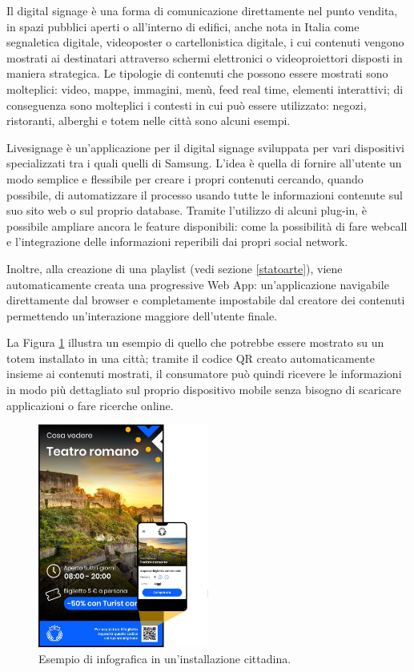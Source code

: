 Il digital signage è una forma di comunicazione direttamente nel punto vendita, in spazi pubblici aperti o all'interno di edifici, anche nota in Italia come segnaletica digitale, videoposter o cartellonistica digitale, i cui contenuti vengono mostrati ai destinatari attraverso schermi elettronici o videoproiettori disposti in maniera strategica. Le tipologie di contenuti che possono essere mostrati sono molteplici: video, mappe, immagini, menù, feed real time, elementi interattivi; di conseguenza sono molteplici i contesti in cui può essere utilizzato: negozi, ristoranti, alberghi e totem nelle città sono alcuni esempi.

Livesignage è un’applicazione per il digital signage sviluppata per vari dispositivi specializzati tra i quali quelli di Samsung. L’idea è quella di fornire all'utente un modo semplice e flessibile per creare i propri contenuti cercando, quando possibile, di automatizzare il processo usando tutte le informazioni contenute sul suo sito web o sul proprio database. Tramite l'utilizzo di alcuni plug-in, è possibile ampliare ancora le feature disponibili: come la possibilità di fare webcall e l'integrazione delle informazioni reperibili dai propri social network.

Inoltre, alla creazione di una playlist (vedi sezione \ref*{statoarte}), viene automaticamente creata una progressive Web App: un'applicazione navigabile direttamente dal browser e completamente impostabile dal creatore dei contenuti permettendo un'interazione maggiore dell'utente finale.

La Figura \ref{fig:liveToursitSample} illustra un esempio di quello che potrebbe essere mostrato su un totem installato in una città; tramite il codice QR creato automaticamente insieme ai contenuti mostrati, il consumatore può quindi ricevere le informazioni in modo più dettagliato sul proprio dispositivo mobile senza bisogno di scaricare applicazioni o fare ricerche online.

\begin{figure}[!htb]
    \centering
    \includegraphics[width= 0.5\textwidth]{images/Introduzione/LiveTurist.jpg} 
    \caption{Esempio di infografica in un'installazione cittadina.} 
    \label{fig:liveToursitSample}
\end{figure}



